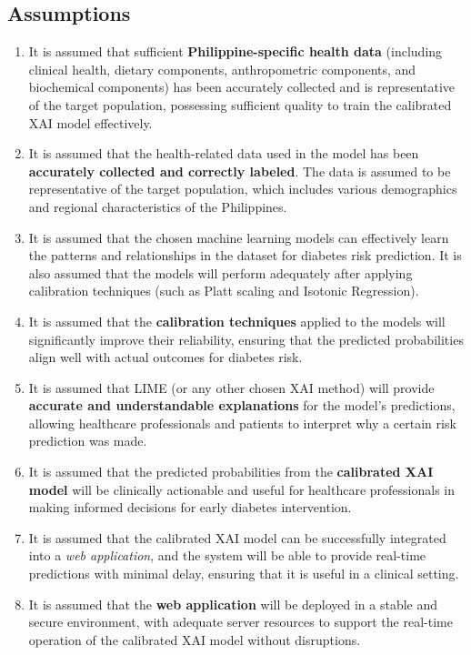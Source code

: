 \subsection{Assumptions}
\begin{enumerate}
    \item It is assumed that sufficient \textbf{Philippine-specific health data} (including clinical health, dietary components, anthropometric components, and biochemical components) has been accurately collected and is representative of the target population, possessing sufficient quality to train the calibrated XAI model effectively.
    
    \item It is assumed that the health-related data used in the model has been \textbf{accurately collected and correctly labeled}. The data is assumed to be representative of the target population, which includes various demographics and regional characteristics of the Philippines.

    \item It is assumed that the chosen machine learning models can effectively learn the patterns and relationships in the dataset for diabetes risk prediction. It is also assumed that the models will perform adequately after applying calibration techniques (such as Platt scaling and Isotonic Regression).

    \item It is assumed that the \textbf{calibration techniques} applied to the models will significantly improve their reliability, ensuring that the predicted probabilities align well with actual outcomes for diabetes risk.

    \item It is assumed that LIME (or any other chosen XAI method) will provide \textbf{accurate and understandable explanations} for the model's predictions, allowing healthcare professionals and patients to interpret why a certain risk prediction was made.

    \item It is assumed that the predicted probabilities from the \textbf{calibrated XAI model} will be clinically actionable and useful for healthcare professionals in making informed decisions for early diabetes intervention.

    \item It is assumed that the calibrated XAI model can be successfully integrated into a \textit{web application}, and the system will be able to provide real-time predictions with minimal delay, ensuring that it is useful in a clinical setting.

    \item It is assumed that the \textbf{web application} will be deployed in a stable and secure environment, with adequate server resources to support the real-time operation of the calibrated XAI model without disruptions.

\end{enumerate}